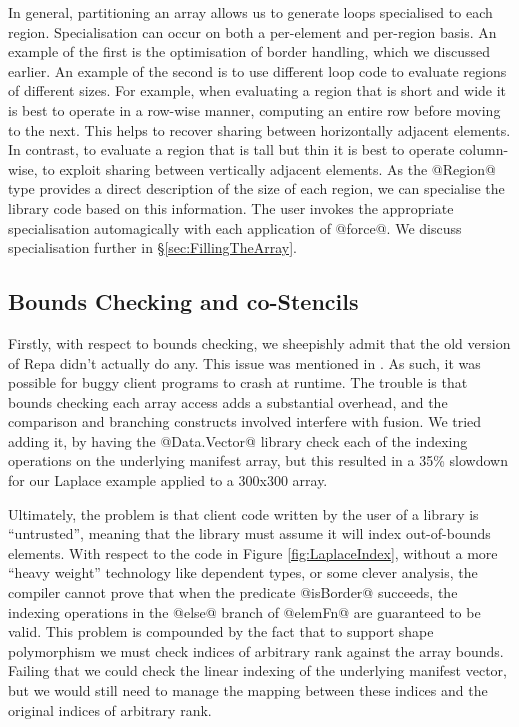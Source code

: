 In general, partitioning an array allows us to generate loops specialised to each region. Specialisation can occur on both a per-element and per-region basis. An example of the first is the optimisation of border handling, which we discussed earlier. An example of the second is to use different loop code to evaluate regions of different sizes. For example, when evaluating a region that is short and wide it is best to operate in a row-wise manner, computing an entire row before moving to the next. This helps to recover sharing between horizontally adjacent elements. In contrast, to evaluate a region that is tall but thin it is best to operate column-wise, to exploit sharing between vertically adjacent elements. As the @Region@ type provides a direct description of the size of each region, we can specialise the library code based on this information. The user invokes the appropriate specialisation automagically with each application of @force@. We discuss specialisation further in \S\ref{sec:FillingTheArray}.


\subsection{Bounds Checking and co-Stencils}
\label{sec:CoStencils}
Firstly, with respect to bounds checking, we sheepishly admit that the old version of Repa didn't actually do any. This issue was mentioned in \cite{Keller:repa}. As such, it was possible for buggy client programs to crash at runtime. The trouble is that bounds checking each array access adds a substantial overhead, and the comparison and branching constructs involved interfere with fusion. We tried adding it, by having the @Data.Vector@ library check each of the indexing operations on the underlying manifest array, but this resulted in a 35\% slowdown for our Laplace example applied to a 300x300 array. 

Ultimately, the problem is that client code written by the user of a library is ``untrusted'', meaning that the library must assume it will index out-of-bounds elements. With respect to the code in Figure \ref{fig:LaplaceIndex}, without a more ``heavy weight'' technology like dependent types, or some clever analysis, the compiler cannot prove that when the predicate @isBorder@ succeeds, the indexing operations in the @else@ branch of @elemFn@ are guaranteed to be valid. This problem is compounded by the fact that to support shape polymorphism we must check indices of arbitrary rank against the array bounds. Failing that we could check the linear indexing of the underlying manifest vector, but we would still need to manage the mapping between these indices and the original indices of arbitrary rank.

